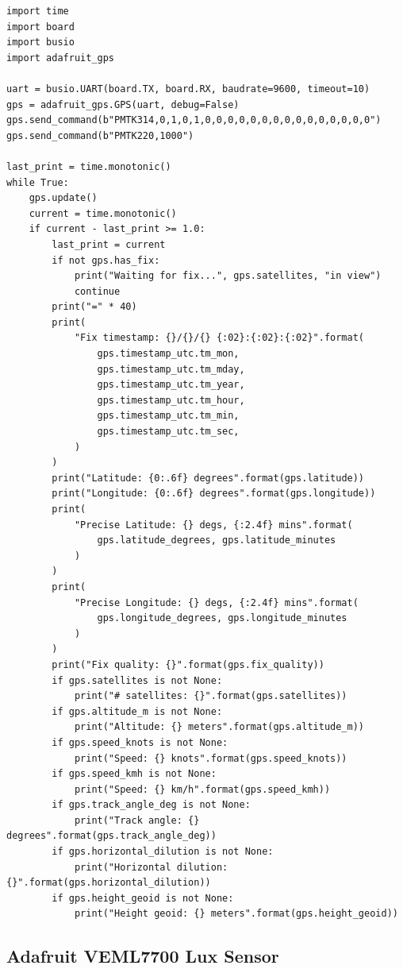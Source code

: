 \documentclass[11pt]{article}
\begin{document}
\begin{lstlisting}
import time
import board
import busio
import adafruit_gps

uart = busio.UART(board.TX, board.RX, baudrate=9600, timeout=10)
gps = adafruit_gps.GPS(uart, debug=False)
gps.send_command(b"PMTK314,0,1,0,1,0,0,0,0,0,0,0,0,0,0,0,0,0,0,0")
gps.send_command(b"PMTK220,1000")

last_print = time.monotonic()
while True:
    gps.update()
    current = time.monotonic()
    if current - last_print >= 1.0:
        last_print = current
        if not gps.has_fix:
            print("Waiting for fix...", gps.satellites, "in view")
            continue
        print("=" * 40)
        print(
            "Fix timestamp: {}/{}/{} {:02}:{:02}:{:02}".format(
                gps.timestamp_utc.tm_mon,
                gps.timestamp_utc.tm_mday,
                gps.timestamp_utc.tm_year,
                gps.timestamp_utc.tm_hour,
                gps.timestamp_utc.tm_min,
                gps.timestamp_utc.tm_sec,
            )
        )
        print("Latitude: {0:.6f} degrees".format(gps.latitude))
        print("Longitude: {0:.6f} degrees".format(gps.longitude))
        print(
            "Precise Latitude: {} degs, {:2.4f} mins".format(
                gps.latitude_degrees, gps.latitude_minutes
            )
        )
        print(
            "Precise Longitude: {} degs, {:2.4f} mins".format(
                gps.longitude_degrees, gps.longitude_minutes
            )
        )
        print("Fix quality: {}".format(gps.fix_quality))
        if gps.satellites is not None:
            print("# satellites: {}".format(gps.satellites))
        if gps.altitude_m is not None:
            print("Altitude: {} meters".format(gps.altitude_m))
        if gps.speed_knots is not None:
            print("Speed: {} knots".format(gps.speed_knots))
        if gps.speed_kmh is not None:
            print("Speed: {} km/h".format(gps.speed_kmh))
        if gps.track_angle_deg is not None:
            print("Track angle: {} degrees".format(gps.track_angle_deg))
        if gps.horizontal_dilution is not None:
            print("Horizontal dilution: {}".format(gps.horizontal_dilution))
        if gps.height_geoid is not None:
            print("Height geoid: {} meters".format(gps.height_geoid))
\end{lstlisting}

\subsection{Adafruit VEML7700 Lux Sensor}
\end{document}
